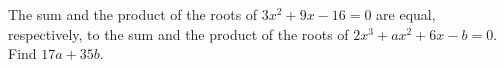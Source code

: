 The sum and the product of the roots of $3x^2+9x-16=0$ are equal, respectively, to the sum and the product of the roots of $2x^3+ax^2+6x-b=0$. Find $17a+35b$.
